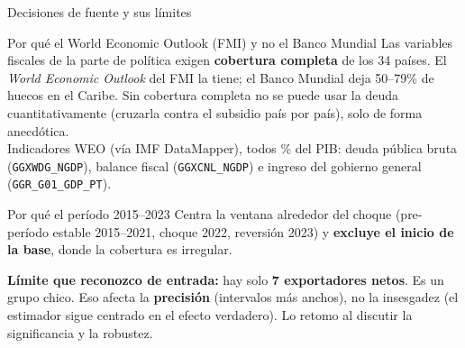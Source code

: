 \documentclass[aspectratio=169,10pt]{beamer}
\newcommand{\key}[1]{{\bfseries\color{AcentoRojo}#1}}
\begin{document}
\begin{frame}{Decisiones de fuente y sus límites}
  \small
  \begin{block}{Por qué el World Economic Outlook (FMI) y no el Banco Mundial}
    Las variables fiscales de la parte de política exigen \textbf{cobertura completa} de los 34
    países. El \emph{World Economic Outlook} del FMI la tiene; el Banco Mundial deja
    \alert{50--79\% de huecos en el Caribe}. Sin cobertura completa no se puede usar la deuda
    cuantitativamente (cruzarla contra el subsidio país por país), solo de forma anecdótica.\\[0.3em]
    {\footnotesize Indicadores WEO (vía IMF DataMapper), todos \% del PIB: deuda pública bruta
    (\texttt{GGXWDG\_NGDP}), balance fiscal (\texttt{GGXCNL\_NGDP}) e ingreso del gobierno general
    (\texttt{GGR\_G01\_GDP\_PT}).}
  \end{block}

  \begin{block}{Por qué el período 2015--2023}
    Centra la ventana alrededor del choque (pre-período estable 2015--2021, choque 2022,
    reversión 2023) y \textbf{excluye el inicio de la base}, donde la cobertura es irregular.
  \end{block}

  \textbf{Límite que reconozco de entrada:} hay solo \key{7 exportadores netos}. Es un grupo
  chico. Eso afecta la \textbf{precisión} (intervalos más anchos), \alert{no la insesgadez} (el
  estimador sigue centrado en el efecto verdadero). Lo retomo al discutir la significancia y la
  robustez.

\end{frame}
\end{document}
